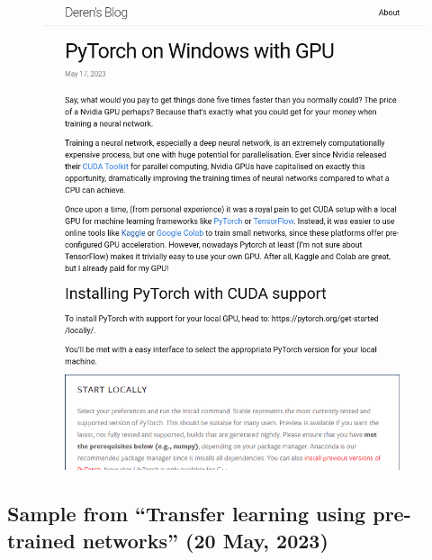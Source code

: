 \begin{figure}[!ht]
    \centering
    \includegraphics[width=\textwidth]{images/q1_sample_of_post_2.png}
\end{figure}

\newpage

\subsection*{Sample from ``Transfer learning using pre-trained networks'' (20 May, 2023)}

